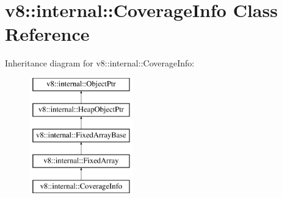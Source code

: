 \hypertarget{classv8_1_1internal_1_1CoverageInfo}{}\section{v8\+:\+:internal\+:\+:Coverage\+Info Class Reference}
\label{classv8_1_1internal_1_1CoverageInfo}
Inheritance diagram for v8\+:\+:internal\+:\+:Coverage\+Info\+:\begin{figure}[H]
\begin{center}
\leavevmode
\includegraphics[height=5.000000cm]{classv8_1_1internal_1_1CoverageInfo}
\end{center}
\end{figure}
